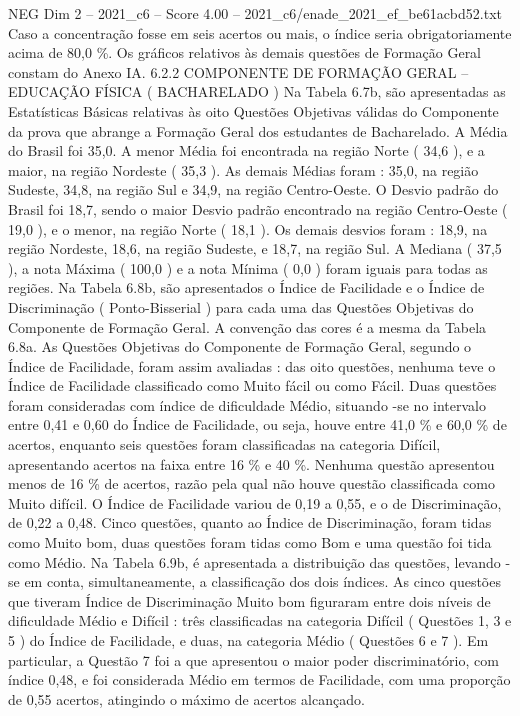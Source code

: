 \begin{textsample}{NEG Dim 2 – 2021\_c6 – Score 4.00 – 2021\_c6/enade\_2021\_ef\_be61acbd52.txt}
Caso a concentração fosse em seis acertos ou mais, o índice seria obrigatoriamente acima de 80,0 \%.
Os gráficos relativos às demais questões de Formação Geral constam do Anexo IA. 6.2.2 COMPONENTE DE FORMAÇÃO GERAL – EDUCAÇÃO FÍSICA ( BACHARELADO ) Na Tabela 6.7b, são apresentadas as Estatísticas Básicas relativas às oito Questões Objetivas válidas do Componente da prova que abrange a Formação Geral dos estudantes de Bacharelado.
A Média do Brasil foi 35,0.
A menor Média foi encontrada na região Norte ( 34,6 ), e a maior, na região Nordeste ( 35,3 ).
As demais Médias foram : 35,0, na região Sudeste, 34,8, na região Sul e 34,9, na região Centro-Oeste.
O Desvio padrão do Brasil foi 18,7, sendo o maior Desvio padrão encontrado na região Centro-Oeste ( 19,0 ), e o menor, na região Norte ( 18,1 ).
Os demais desvios foram : 18,9, na região Nordeste, 18,6, na região Sudeste, e 18,7, na região Sul.
A Mediana ( 37,5 ), a nota Máxima ( 100,0 ) e a nota Mínima ( 0,0 ) foram iguais para todas as regiões.
Na Tabela 6.8b, são apresentados o Índice de Facilidade e o Índice de Discriminação ( Ponto-Bisserial ) para cada uma das Questões Objetivas do Componente de Formação Geral.
A convenção das cores é a mesma da Tabela 6.8a.
As Questões Objetivas do Componente de Formação Geral, segundo o Índice de Facilidade, foram assim avaliadas : das oito questões, nenhuma teve o Índice de Facilidade classificado como Muito fácil ou como Fácil.
Duas questões foram consideradas com índice de dificuldade Médio, situando -se no intervalo entre 0,41 e 0,60 do Índice de Facilidade, ou seja, houve entre 41,0 \% e 60,0 \% de acertos, enquanto seis questões foram classificadas na categoria Difícil, apresentando acertos na faixa entre 16 \% e 40 \%.
Nenhuma questão apresentou menos de 16 \% de acertos, razão pela qual não houve questão classificada como Muito difícil.
O Índice de Facilidade variou de 0,19 a 0,55, e o de Discriminação, de 0,22 a 0,48.
Cinco questões, quanto ao Índice de Discriminação, foram tidas como Muito bom, duas questões foram tidas como Bom e uma questão foi tida como Médio.
Na Tabela 6.9b, é apresentada a distribuição das questões, levando -se em conta, simultaneamente, a classificação dos dois índices.
As cinco questões que tiveram Índice de Discriminação Muito bom figuraram entre dois níveis de dificuldade Médio e Difícil : três classificadas na categoria Difícil ( Questões 1, 3 e 5 ) do Índice de Facilidade, e duas, na categoria Médio ( Questões 6 e 7 ).
Em particular, a Questão 7 foi a que apresentou o maior poder discriminatório, com índice 0,48, e foi considerada Médio em termos de Facilidade, com uma proporção de 0,55 acertos, atingindo o máximo de acertos alcançado.

\end{textsample}
